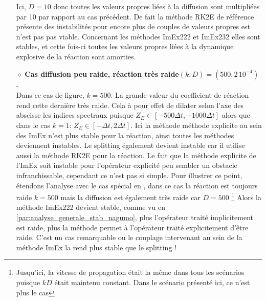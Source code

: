 \begin{itemize}
                        Ici, $D=10$ donc toutes les valeurs propres liées à la diffusion sont multipliées par 10 par rapport au cas précédent. 
                        De fait la méthode RK2E de référence présente des instabilités pour encore plus de couples de valeurs propres est n'est pas pas viable.
                        Concernant les méthodes ImEx222 et ImEx232 elles sont stables, et cette fois-ci toutes les valeurs propres liées à la 
                        dynamique explosive de la réaction sont amorties. 
                    \item[$\diamond$]\textbf{Cas diffusion peu raide, réaction très raide$(k,D)=(500,2\, 10^{-4})$} - \\
                        Dans ce cas de figure, $k=500$. La grande valeur du coefficient de réaction rend cette dernière très raide. 
                        Cela à pour effet de dilater selon l'axe des abscisse les indices spectraux puisque $Z_E \in [- 500 \Delta t, + 1000 \Delta t]$
                        alors que dans le cas $k=1$: $Z_E \in [- \Delta t , 2\Delta t]$.
                        Ici la méthode méthode explicite au sein des ImEx n'est plus stable pour la réaction, ainsi toutes les méthodes deviennent instables. 
                        Le splitting également devient instable car il utilise aussi la méthode RK2E pour la réaction. 
                        Le fait que la méthode explicite de l'ImEx soit instable pour l'opérateur explicité peu sembler un obstacle infranchissable,
                        cependant ce n'est pas si simple.
                        Pour illustrer ce point, étendons l'analyse avec le cas spécial en , dans ce cas la réaction est toujours raide $k=500$ mais la diffusion est également très raide car $D=500$
                        \footnote{Jusqu'ici, la vitesse de propagation était la même dans tous les scénarios puisque $kD$ était maintenu constant. Dans le scénario présenté ici, ce n'est plus le cas}
                        Alors la méthode ImEx222 devient stable, comme vu en \ref{par:analyse_generale_stab_nagumo}, plus l'opérateur traité implicitement est raide, 
                        plus la méthode permet à l'opérateur traité explicitement d'être raide. C'est un cas remarquable ou le couplage intervenant au sein de la méthode ImEx
                        la rend plus stable que le splitting !
                \end{itemize}
